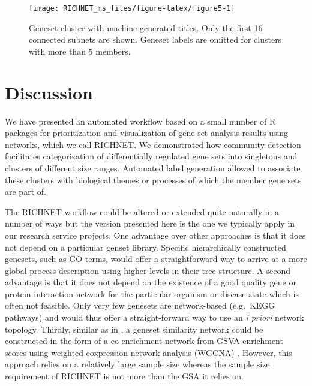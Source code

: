 \documentclass[9pt,a4paper,]{extarticle}
\theoremstyle{definition}
\theoremstyle{definition}
\theoremstyle{definition}
\theoremstyle{remark}
\begin{document}
\newpage 

\begin{figure}

{\centering \texttt{[image: RICHNET\_ms\_files/figure-latex/figure5-1]} 

}

\caption{Geneset cluster with machine-generated titles. Only the first 16 connected subnets are shown. Geneset labels are omitted for clusters with more than 5 members.}\label{fig:figure5}
\end{figure}\newpage 

\newpage 

\section{Discussion}\label{discussion}

We have presented an automated workflow based on a small number of R packages for prioritization and visualization of gene set analysis results using networks, which we call RICHNET. We demonstrated how community detection facilitates categorization of differentially regulated gene sets into singletons and clusters of different size ranges. Automated label generation allowed to associate these clusters with biological themes or processes of which the member gene sets are part of.

The RICHNET workflow could be altered or extended quite naturally in a number of ways but the version presented here is the one we typically apply in our research service projects. One advantage over other approaches is that it does not depend on a particular genset library. Specific hierarchically constructed genesets, such as GO terms, would offer a straightforward way to arrive at a more global process description using higher levels in their tree structure. A second advantage is that it does not depend on the existence of a good quality gene or protein interaction network for the particular organism or disease state which is often not feasible. Only very few genesets are network-based (e.g.~KEGG pathways) and would thus offer a straight-forward way to use an \emph{i priori} network topology. Thirdly, similar as in \citep{Thorsson2018}, a geneset similarity network could be constructed in the form of a co-enrichment network from GSVA enrichment scores \citep{Hanzelmann2013} using weighted coxpression network analysis (WGCNA) \citep{Langfelder2008}. However, this approach relies on a relatively large sample size whereas the sample size requirement of RICHNET is not more than the GSA it relies on.
\end{document}
